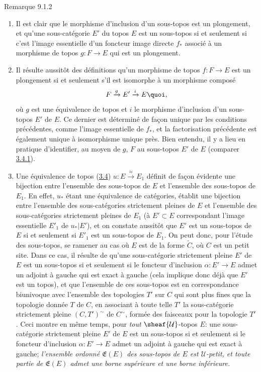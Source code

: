 \documentclass[10pt]{../fichiers-configuration-latex/smfart}
\begin{document}
\begin{enonce*}[remark]{Remarque 9.1.2}
\begin{enumerate}
\renewcommand{\theenumi}{\alph{enumi}}
\renewcommand{\labelenumi}{\theenumi)}
\item Il est clair que le morphisme d'inclusion d'un sous-topos est un
plongement, et qu'une sous-catégorie $E'$ du topos $E$ est un
sous-topos si et seulement si c'est l'image essentielle d'un
foncteur image directe $f_{\ast}$ associé à un morphisme de topos
$g:F\rightarrow E$ qui est un plongement.

\item Il résulte aussitôt des définitions qu'un morphisme de topos
$f:F\rightarrow E$ est un plongement si et seulement s'il est
isomorphe à un morphisme composé
$$
F\xrightarrow{g}E'\xrightarrow{i}E{\quoi},
$$
où $g$ est une équivalence de topos et $i$ le morphisme d'inclusion
d'un sous-topos $E'$ de $E$. Ce dernier est déterminé de façon
unique par les conditions précédentes, comme l'image essentielle de
$f_{\ast}$, et la factorisation précédente est également unique à
isomorphisme unique près. Bien entendu, il y a lieu en pratique
d'identifier, au moyen de $g$, $F$ au sous-topos $E'$ de $E$
(comparer \hyperref[IV.subsubsec3.4.1]{3.4.1}).

\item Une équivalence de topos (\hyperref[IV.subsec3.4]{3.4})
  $u:E\xrightarrow{\approx}E_1$
définit de façon évidente une bijection entre l'ensemble des
sous-topos de $E$ et l'ensemble des sous-topos de $E_1$. En effet,
$u_{\ast}$ étant une équivalence de catégories,\pageoriginale
établit une bijection entre l'ensemble des sous-catégories
strictement pleines de $E$ et l'ensemble des sous-catégories
strictement pleines de $E_1$ (à $E'\subset E$ correspondant l'image
essentielle $E'_1$ de $u_{\ast}| E'$), et on constate aussitôt que
$E'$ est un sous-topos de $E$ si et seulement si $E'_1$ est un
sous-topos de $E_1$. On peut donc, pour l'étude des sous-topos, se
ramener au cas où $E$ est de la forme $\widetilde{C}$, où $C$ est un
petit site. Dans ce cas, il résulte de  qu'une
sous-catégorie strictement pleine $E'$ de $E$ est un sous-topos si
et seulement si le foncteur d'inclusion $\alpha:E'\rightarrow E$
admet un adjoint à gauche qui est exact à gauche (cela implique donc
déjà que $E'$ est un topos), et que l'ensemble de ces sous-topos est
en correspondance biunivoque avec l'ensemble des topologies $T'$ sur
$C$ qui sont plus fines que la topologie donnée $T$ de $C$, en
associant à toute telle $T'$ la sous-catégorie strictement pleine
$(C,T')^{\sim}$ de $C^{\sim}$, formée des faisceaux pour la
topologie $T'$. Ceci montre en même temps, pour \emph{tout}
$\sheaf{\mathcal{U}}$-topos $E$: une sous-catégorie strictement
pleine $E'$ de $E$ est un sous-topos si et seulement si le foncteur
d'inclusion $\alpha:E'\rightarrow E$ admet un adjoint à gauche qui
est exact à gauche; \emph{l'ensemble ordonné $\mathfrak{E}(E)$ des
sous-topos de $E$ est $\mathcal{U}$-petit, et toute partie de
$\mathfrak{E}(E)$ admet une borne supérieure et une borne
inférieure.}


\end{enumerate}
\end{enonce*}
\end{document}
